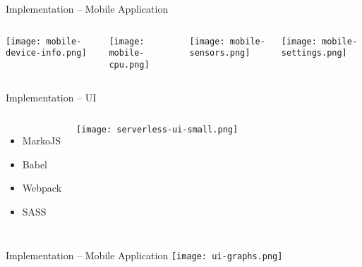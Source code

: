 \begin{frame}{Implementation -- Mobile Application}
  \begin{columns}
    \vfill
    \vspace*{2em}
    \centering
    \texttt{[image: mobile-device-info.png]}

    \vfill
    \vspace*{2em}
    \centering
    \texttt{[image: mobile-cpu.png]}

    \vfill
    \vspace*{2em}
    \centering
    \texttt{[image: mobile-sensors.png]}

    \vfill
    \vspace*{2em}
    \centering
    \texttt{[image: mobile-settings.png]}
  \end{columns}
\end{frame}

\begin{frame}{Implementation -- UI}
  \begin{columns}
      \begin{itemize}
        \item MarkoJS
        \item Babel
        \item Webpack
        \item SASS
      \end{itemize}
      \vfill
      \centering
      \texttt{[image: serverless-ui-small.png]}
   \end{columns}
  \end{frame}

  \begin{frame}{Implementation -- Mobile Application}
    \vfill
    \centering
    \texttt{[image: ui-graphs.png]}
  \end{frame}
